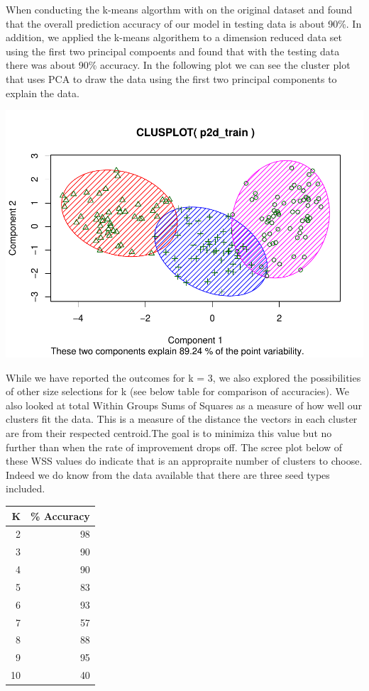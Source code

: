 \documentclass[]{article}
\begin{document}
When conducting the k-means algorthm with on the original dataset and
found that the overall prediction accuracy of our model in testing data
is about 90\%. In addition, we applied the k-means algorithem to a
dimension reduced data set using the first two principal compoents and
found that with the testing data there was about 90\% accuracy. In the
following plot we can see the cluster plot that uses PCA to draw the
data using the first two principal components to explain the data.

\includegraphics{Project2_files/figure-latex/unnamed-chunk-3-1.pdf}

While we have reported the outcomes for k = 3, we also explored the
possibilities of other size selections for k (see below table for
comparison of accuracies). We also looked at total Within Groups Sums of
Squares as a measure of how well our clusters fit the data. This is a
measure of the distance the vectors in each cluster are from their
respected centroid.The goal is to minimiza this value but no further
than when the rate of improvement drops off. The scree plot below of
these WSS values do indicate that is an appropraite number of clusters
to choose. Indeed we do know from the data available that there are
three seed types included.

\begin{longtable}[]{@{}rr@{}}
\toprule
K & \% Accuracy\tabularnewline
\midrule
\endhead
2 & 98\tabularnewline
3 & 90\tabularnewline
4 & 90\tabularnewline
5 & 83\tabularnewline
6 & 93\tabularnewline
7 & 57\tabularnewline
8 & 88\tabularnewline
9 & 95\tabularnewline
10 & 40\tabularnewline
\bottomrule
\end{longtable}
\end{document}
